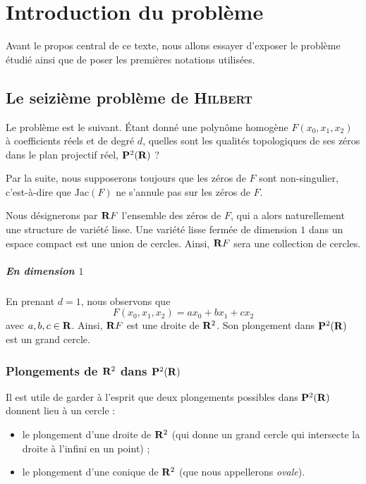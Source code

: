 \documentclass{livre}
\begin{document}
\tableofcontents

\newpage
\chapter{Introduction du problème}

Avant le propos central de ce texte, nous allons essayer d'exposer le problème étudié ainsi que de poser les premières notations utilisées.

\section{Le seizième problème de \textsc{Hilbert}}

Le problème est le suivant. \'Etant donné une polynôme homogène $F(x_0,x_1,x_2)$ à coefficients réels et de degré $d$, quelles sont les qualités topologiques de ses zéros dans le plan projectif réel, $\mathbf{P}^{2}(\mathbf{R})$ ? 

Par la suite, nous supposerons toujours que les zéros de $F$ sont non-singulier, c'est-à-dire que $\mathrm{Jac}(F)$ ne s'annule pas sur les zéros de $F$.

Nous désignerons par $\mathbf{R} F$ l'ensemble des zéros de $F$, qui a alors  naturellement une structure de variété lisse. Une variété lisse fermée de dimension $1$ dans un espace compact est une union de cercles. Ainsi, $\mathbf{R} F$ sera une collection de cercles.


\paragraph{En dimension $1$}En prenant $d=1$, nous observons que \[ F(x_0,x_1,x_2) = ax_0 + bx_1+cx_2 \]avec $a,b,c\in \mathbf{R}$. Ainsi, $\mathbf{R} F$ est une droite de $\mathbf{R}^{2}$. Son plongement dans $\mathbf{P}^{2}(\mathbf{R})$ est un grand cercle.

\subsection*{Plongements de $\mathbf{R}^{2}$ dans $\mathbf{P}^{2}(\mathbf{R})$}

Il est utile de garder à l'esprit que deux plongements possibles dans $\mathbf{P}^{2}(\mathbf{R})$ donnent lieu à un cercle :

\begin{itemize}
\item le plongement d'une droite de $\mathbf{R}^{2}$ (qui donne un grand cercle qui intersecte la droite à l'infini en un point) ;
\item le plongement d'une conique de $\mathbf{R}^{2}$ (que nous appellerons \textit{ovale}).
\end{itemize}
\end{document}
